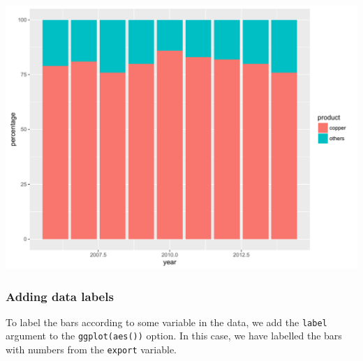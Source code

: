 \documentclass[]{article}
\newenvironment{Shaded}{\begin{snugshade}}{\end{snugshade}}
\newcommand{\KeywordTok}[1]{\textcolor[rgb]{0.13,0.29,0.53}{\textbf{{#1}}}}
\newcommand{\DataTypeTok}[1]{\textcolor[rgb]{0.13,0.29,0.53}{{#1}}}
\newcommand{\DecValTok}[1]{\textcolor[rgb]{0.00,0.00,0.81}{{#1}}}
\newcommand{\StringTok}[1]{\textcolor[rgb]{0.31,0.60,0.02}{{#1}}}
\newcommand{\NormalTok}[1]{{#1}}
\begin{document}
\begin{center}\includegraphics{0_all_posts_pdf/stacked_1-1} \end{center}

\subsubsection{Adding data labels}\label{adding-data-labels-1}

To label the bars according to some variable in the data, we add the
\texttt{label} argument to the \texttt{ggplot(aes())} option. In this
case, we have labelled the bars with numbers from the \texttt{export}
variable.

\begin{Shaded}
\end{Shaded}
\end{document}
